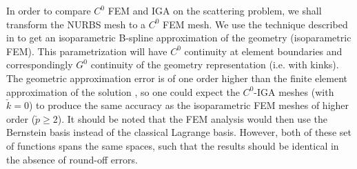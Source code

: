 In order to compare $C^0$ FEM and IGA on the scattering problem, we shall transform the NURBS mesh to a $C^0$ FEM mesh. We use the technique described in  to get an isoparametric B-spline approximation of the geometry (isoparametric FEM). This parametrization will have $C^0$ continuity at element boundaries and correspondingly $G^0$ continuity of the geometry representation (i.e. with kinks). The geometric approximation error is of one order higher than the finite element approximation of the solution \cite{Strang1973aao}, so one could expect the $C^0$-IGA meshes (with $\check{k}=0$) to produce the same accuracy as the isoparametric FEM meshes of higher order ($\check{p}\geq 2$). It should be noted that the FEM analysis would then use the Bernstein basis instead of the classical Lagrange basis. However, both of these set of functions spans the same spaces, such that the results should be identical in the absence of round-off errors. 

